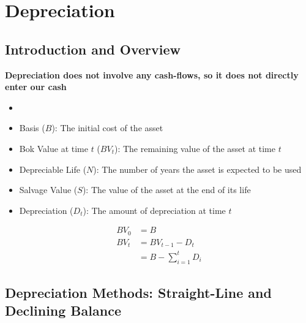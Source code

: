 \chapter{Depreciation}

\section{Introduction and Overview}

\begin{proposition}
    \textbf{Depreciation does not involve any cash-flows, so it does not directly enter our cash}
\end{proposition}

\begin{proposition}
    \begin{itemize}
        \item[]
        \item Basis ($B$): The initial cost of the asset
        \item Bok Value at time $t$ ($BV_t$): The remaining value of the asset at time $t$
        \item Depreciable Life ($N$): The number of years the asset is expected to be used
        \item Salvage Value ($S$): The value of the asset at the end of its life
        \item Depreciation ($D_t$): The amount of depreciation at time $t$
    \end{itemize}
\end{proposition}

\begin{theorem}
    \begin{align}
        BV_0 & = B                      \\
        BV_t & = BV_{t-1} - D_t         \\
             & = B - \sum_{i=1}^{t} D_i
    \end{align}
\end{theorem}

\section{Depreciation Methods: Straight-Line and Declining Balance}


